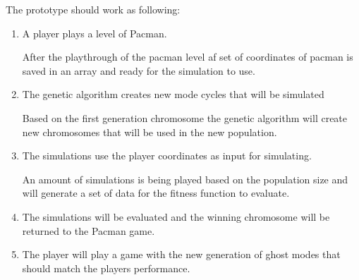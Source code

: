 The prototype should work as following:

\begin{enumerate}
\item A player plays a level of Pacman.

After the playthrough of the pacman level af set of coordinates of pacman is saved in an array and ready for the simulation to use.

\item The genetic algorithm creates new mode cycles that will be simulated

Based on the first generation chromosome the genetic algorithm will create new chromosomes that will be used in the new population.

\item The simulations use the player coordinates as input for simulating.

An amount of simulations is being played based on the population size and will generate a set of data for the fitness function to evaluate.

\item The simulations will be evaluated and the winning chromosome will be returned to the Pacman game.

\item The player will play a game with the new generation of ghost modes that should match the players performance.

\end{enumerate}

